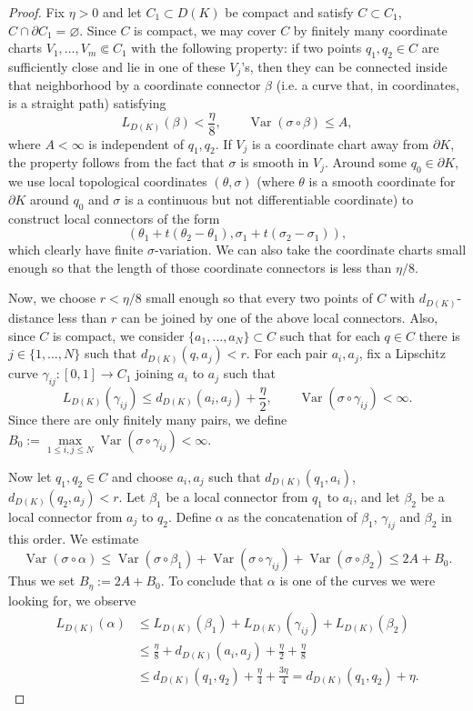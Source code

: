 \documentclass[10pt,a4paper]{amsart}
\begin{document}
\begin{proof}
Fix $\eta>0$ and let $C_1\subset D(K)$ be compact and satisfy $C\subset C_1$, $C\cap \partial C_1 = \varnothing$. Since $C$ is compact, we may cover $C$ by finitely many coordinate charts $V_1,\ldots,V_m\Subset C_1$ with the following
property: if two points $q_1,q_2\in C$ are sufficiently close and lie in one of these $V_j$'s, then they can be connected inside that
neighborhood by a coordinate connector $\beta$ (i.e. a curve that, in coordinates, is a straight path) satisfying
$$L_{D(K)}(\beta)<\frac{\eta}{8},
\qquad
\operatorname{Var}(\sigma\circ\beta)\le A,$$
where $A<\infty$ is independent of $q_1,q_2$.
If $V_j$ is a coordinate chart away from $\partial K$, the property follows from the fact that $\sigma$ is smooth in $V_j$. Around some $q_0\in \partial K$, we use local topological coordinates $(\theta,\sigma)$ (where $\theta$ is a smooth coordinate for $\partial K$ around $q_0$ and $\sigma$ is a continuous but not differentiable coordinate) to construct local connectors of the form
$$(\theta_1+ t(\theta_2-\theta_1),\sigma_1+t(\sigma_2-\sigma_1)),$$
which clearly have finite $\sigma$-variation. We can also take the coordinate charts small enough so that the length of those coordinate connectors is less than $\eta/8$.

Now, we choose $r<\eta/8$ small enough so that every two points of $C$ with $d_{D(K)}$-distance less than $r$ can be joined by one of the above local connectors. Also, since $C$ is compact, we consider $\{a_1,\ldots,a_N\}\subset C$ such that for each $q\in C$ there is $j\in \{1,\ldots,N\}$ such that $d_{D(K)}(q,a_j)<r$. For each pair $a_i,a_j$, fix a Lipschitz curve $\gamma_{ij}:[0,1]\to C_1$ joining $a_i$ to $a_j$ such that
$$L_{D(K)}(\gamma_{ij})
\le d_{D(K)}(a_i,a_j)+\frac{\eta}{2},
\qquad
\operatorname{Var}(\sigma\circ\gamma_{ij})<\infty.$$
Since there are only finitely many pairs, we define $B_0:=\max\limits_{1\le i,j\le N} \operatorname{Var}(\sigma\circ\gamma_{ij})<\infty$.

Now let $q_1,q_2\in C$ and choose $a_i,a_j$ such that $d_{D(K)}(q_1,a_i)$, $d_{D(K)}(q_2,a_j)<r$. Let $\beta_1$ be a local connector from $q_1$ to $a_i$, and let $\beta_2$ be a local connector from $a_j$ to $q_2$. Define $\alpha$ as the concatenation of $\beta_1$, $\gamma_{ij}$ and $\beta_2$ in this order. We estimate
$$\operatorname{Var}(\sigma\circ\alpha) \le \operatorname{Var}(\sigma\circ\beta_1) + \operatorname{Var}(\sigma\circ\gamma_{ij}) + \operatorname{Var}(\sigma\circ\beta_2) \le 2A+B_0.$$
Thus we set $B_\eta:=2A+B_0$. 
To conclude that $\alpha$ is one of the curves we were looking for, we observe
\begin{equation*}
\begin{split}
L_{D(K)}(\alpha) &\le L_{D(K)}(\beta_1) + L_{D(K)}(\gamma_{ij}) + L_{D(K)}(\beta_2)\\
&\le \frac{\eta}{8} + d_{D(K)}(a_i,a_j) + \frac{\eta}{2} + \frac{\eta}{8}\\
&\le d_{D(K)}(q_1,q_2) +\frac{\eta}{4}+\frac{3\eta}{4} = d_{D(K)}(q_1,q_2) +\eta.
\end{split}
\end{equation*}
\end{proof}
\end{document}
